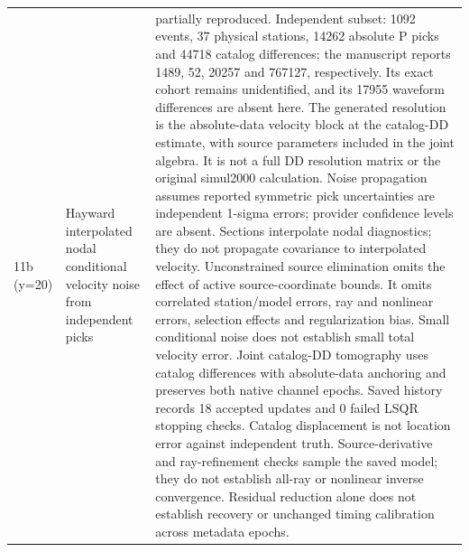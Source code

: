 \begin{longtable}{>{\raggedright\arraybackslash}p{}>{\raggedright\arraybackslash}p{}>{\raggedright\arraybackslash}p{}}
11b (y=20) & Hayward interpolated nodal conditional velocity noise from independent picks & partially reproduced. Independent subset: 1092 events, 37 physical stations, 14262 absolute P picks and 44718 catalog differences; the manuscript reports 1489, 52, 20257 and 767127, respectively. Its exact cohort remains unidentified, and its 17955 waveform differences are absent here. The generated resolution is the absolute-data velocity block at the catalog-DD estimate, with source parameters included in the joint algebra. It is not a full DD resolution matrix or the original simul2000 calculation. Noise propagation assumes reported symmetric pick uncertainties are independent 1-sigma errors; provider confidence levels are absent. Sections interpolate nodal diagnostics; they do not propagate covariance to interpolated velocity. Unconstrained source elimination omits the effect of active source-coordinate bounds. It omits correlated station/model errors, ray and nonlinear errors, selection effects and regularization bias. Small conditional noise does not establish small total velocity error. Joint catalog-DD tomography uses catalog differences with absolute-data anchoring and preserves both native channel epochs. Saved history records 18 accepted updates and 0 failed LSQR stopping checks. Catalog displacement is not location error against independent truth. Source-derivative and ray-refinement checks sample the saved model; they do not establish all-ray or nonlinear inverse convergence. Residual reduction alone does not establish recovery or unchanged timing calibration across metadata epochs.\\

\end{longtable}
